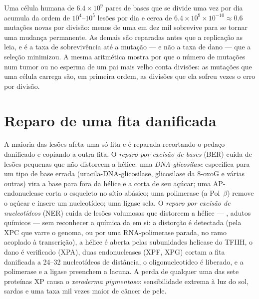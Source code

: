\begin{example}\label{ex:b3:dna-repair:numbers}
Uma célula humana de $6.4\times 10^{9}$ pares de bases que se divide
uma vez por dia acumula da ordem de $10^{4}$--$10^{5}$ lesões por dia
e cerca de $6.4\times 10^{9}\times 10^{-10} \approx 0.6$ mutações
novas por divisão: menos de uma  em dez mil sobrevive para se
tornar uma mudança permanente. As demais são reparadas antes que a
replicação as leia, e é a taxa de sobrevivência até a mutação --- e
não a taxa de dano --- que a seleção minimizou. A mesma aritmética
mostra por que o número de mutações num tumor ou no esperma de um pai
mais velho conta divisões: as mutações que uma célula carrega são, em
primeira ordem, as divisões que ela sofreu vezes o erro por divisão.
\end{example}

\section{Reparo de uma fita danificada}

\begin{definition}\label{def:b3:dna-repair:excision}
A maioria das lesões afeta uma só fita e é reparada recortando o
pedaço danificado e copiando a outra fita. O \emph{reparo por excisão
de bases} (BER) cuida de lesões pequenas que não distorcem a hélice:
uma \emph{DNA-glicosilase} específica para um tipo de base errada
(uracila-DNA-glicosilase, glicosilase da 8-oxoG e várias outras) vira
a base para fora da hélice e a corta de seu açúcar; uma AP-endonuclease
corta o esqueleto no sítio abásico; uma polimerase (a Pol~$\beta$)
remove o açúcar e insere um nucleotídeo; uma ligase sela. O
\emph{reparo por excisão de nucleotídeos} (NER) cuida de lesões
volumosas que distorcem a hélice --- , adutos
químicos --- sem reconhecer a química da  em si: a distorção é
detectada (pela XPC que varre o genoma, ou por uma RNA-polimerase
parada, no ramo acoplado à transcrição), a hélice é aberta pelas
subunidades helicase do TFIIH, o dano é verificado (XPA), duas
endonucleases (XPF, XPG) cortam a fita danificada a
\numrange{24}{32} nucleotídeos de distância, o oligonucleotídeo é
liberado, e a polimerase e a ligase preenchem a lacuna. A perda de
qualquer uma das sete proteínas XP causa o \emph{xeroderma
pigmentoso}: sensibilidade extrema à luz do sol, sardas e uma taxa mil
vezes maior de câncer de pele.
\end{definition}


